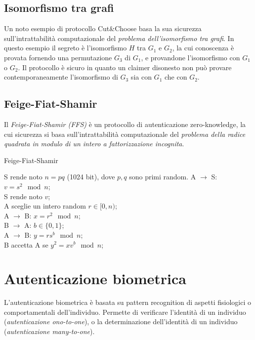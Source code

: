 \subsection{Isomorfismo tra grafi}
Un noto esempio di protocollo Cut\&Choose basa la sua sicurezza sull'intrattabilità computazionale del \textit{problema dell'isomorfismo tra grafi}. In questo esempio il segreto è l'isomorfismo $H$ tra $G_{1}$ e $G_{2}$, la cui conoscenza è provata fornendo una permutazione $G_{3}$ di $G_{1}$, e provandone l'isomorfismo con $G_{1}$ o $G_{2}$. Il protocollo è sicuro in quanto un claimer disonesto non può provare contemporaneamente l'isomorfismo di $G_{3}$ sia con $G_{1}$ che con $G_{2}$.


\subsection{Feige-Fiat-Shamir}
Il \textit{Feige-Fiat-Shamir (FFS)} è un protocollo di autenticazione zero-knowledge, la cui sicurezza si basa sull'intrattabilità computazionale del \textit{problema della radice quadrata in modulo di un intero a fattorizzazione incognita}.

\bigskip
\begin{algorithm}[H]
  \caption{Feige-Fiat-Shamir}
  \label{alg:authentication-zero-knowledge-feige-fiat-shamir}
  \SetAlgoNoLine
  S rende noto $n=pq$ (1024 bit), dove $p,q$ sono primi random.
  A $\rightarrow$ S: $v=s^{2} \mod n$;\\
  S rende noto $v$;\\
  A sceglie un intero random $r \in [0,n)$;\\
  A $\rightarrow$ B: $x=r^{2} \mod n$;\\
  B $\rightarrow$ A: $b \in \{0,1\}$;\\
  A $\rightarrow$ B: $y=rs^{b} \mod n$;\\
  B accetta A se $y^{2}=xv^{b} \mod n$;\\
\end{algorithm}


\section{Autenticazione biometrica}
L'autenticazione biometrica è basata su pattern recognition di aspetti fisiologici o comportamentali dell'individuo.
Permette di verificare l'identità di un individuo (\textit{autenticazione ono-to-one}), o la determinazione dell'identità di un individuo (\textit{autenticazione many-to-one}).

